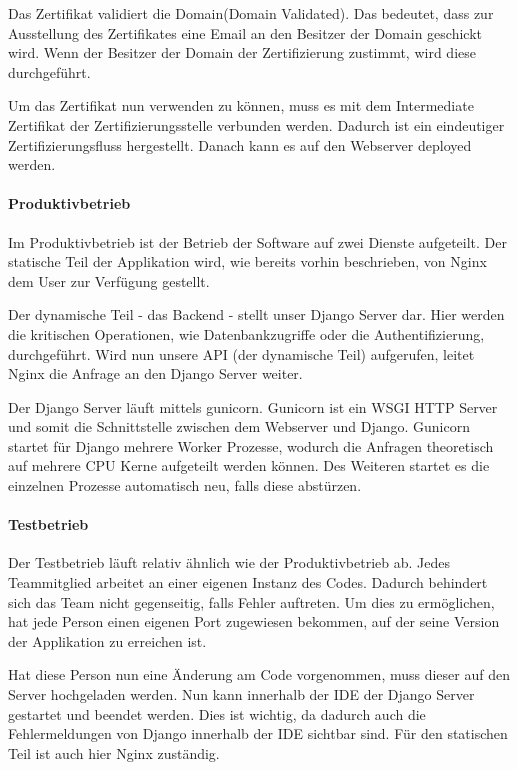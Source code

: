 Das Zertifikat validiert die Domain(Domain Validated). Das bedeutet, dass zur Ausstellung des Zertifikates eine Email an den Besitzer der Domain geschickt wird. Wenn der Besitzer der Domain der Zertifizierung zustimmt, wird diese durchgeführt. 

Um das Zertifikat nun verwenden zu können, muss es mit dem Intermediate Zertifikat der Zertifizierungsstelle verbunden werden. Dadurch ist ein eindeutiger Zertifizierungsfluss hergestellt. Danach kann es auf den Webserver deployed werden.
   
\paragraph{Produktivbetrieb}
Im Produktivbetrieb ist der Betrieb der Software auf zwei Dienste aufgeteilt. Der statische Teil der Applikation wird, wie bereits vorhin beschrieben, von Nginx dem User zur Verfügung gestellt. 

Der dynamische Teil - das Backend - stellt unser Django Server dar. Hier werden die kritischen Operationen, wie Datenbankzugriffe oder die Authentifizierung, durchgeführt. Wird nun unsere \gls{API} (der dynamische Teil) aufgerufen, leitet Nginx die Anfrage an den Django Server weiter. \\


Der Django Server läuft mittels gunicorn. Gunicorn ist ein \gls{WSGI} HTTP Server und somit die Schnittstelle zwischen dem Webserver und Django. Gunicorn startet für Django mehrere Worker Prozesse, wodurch die Anfragen theoretisch auf mehrere CPU Kerne aufgeteilt werden können. Des Weiteren startet es die einzelnen Prozesse automatisch neu, falls diese abstürzen.
\paragraph{Testbetrieb}
Der Testbetrieb läuft relativ ähnlich wie der Produktivbetrieb ab. Jedes Teammitglied arbeitet an einer eigenen Instanz des Codes. Dadurch behindert sich das Team nicht gegenseitig, falls Fehler auftreten. Um dies zu ermöglichen, hat jede Person einen eigenen Port zugewiesen bekommen, auf der seine Version der Applikation zu erreichen ist. 

Hat diese Person nun eine Änderung am Code vorgenommen, muss dieser auf den Server hochgeladen werden. Nun kann innerhalb der IDE der Django Server gestartet und beendet werden. Dies ist wichtig, da dadurch auch die Fehlermeldungen von Django innerhalb der \gls{IDE} sichtbar sind. Für den statischen Teil ist auch hier Nginx zuständig.


